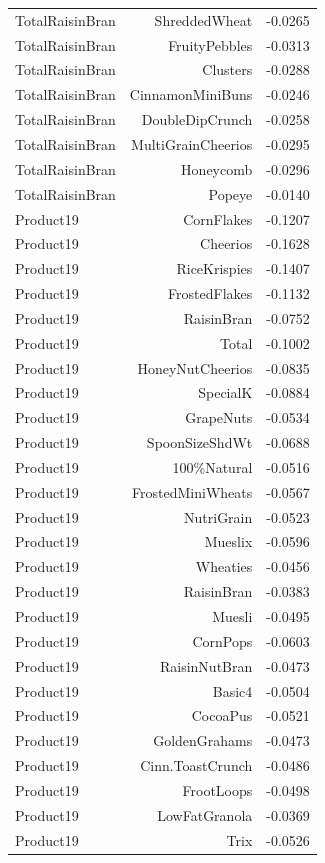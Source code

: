 \begin{longtable}{@{}lrr@{}}
TotalRaisinBran & ShreddedWheat & -0.0265 \\
TotalRaisinBran & FruityPebbles & -0.0313 \\
TotalRaisinBran & Clusters & -0.0288 \\
TotalRaisinBran & CinnamonMiniBuns & -0.0246 \\
TotalRaisinBran & DoubleDipCrunch & -0.0258 \\
TotalRaisinBran & MultiGrainCheerios & -0.0295 \\
TotalRaisinBran & Honeycomb & -0.0296 \\
TotalRaisinBran & Popeye & -0.0140 \\
Product19 & CornFlakes & -0.1207 \\
Product19 & Cheerios & -0.1628 \\
Product19 & RiceKrispies & -0.1407 \\
Product19 & FrostedFlakes & -0.1132 \\
Product19 & RaisinBran & -0.0752 \\
Product19 & Total & -0.1002 \\
Product19 & HoneyNutCheerios & -0.0835 \\
Product19 & SpecialK & -0.0884 \\
Product19 & GrapeNuts & -0.0534 \\
Product19 & SpoonSizeShdWt & -0.0688 \\
Product19 & 100\%Natural & -0.0516 \\
Product19 & FrostedMiniWheats & -0.0567 \\
Product19 & NutriGrain & -0.0523 \\
Product19 & Mueslix & -0.0596 \\
Product19 & Wheaties & -0.0456 \\
Product19 & RaisinBran & -0.0383 \\
Product19 & Muesli & -0.0495 \\
Product19 & CornPops & -0.0603 \\
Product19 & RaisinNutBran & -0.0473 \\
Product19 & Basic4 & -0.0504 \\
Product19 & CocoaPus & -0.0521 \\
Product19 & GoldenGrahams & -0.0473 \\
Product19 & Cinn.ToastCrunch & -0.0486 \\
Product19 & FrootLoops & -0.0498 \\
Product19 & LowFatGranola & -0.0369 \\
Product19 & Trix & -0.0526 \\

\end{longtable}
